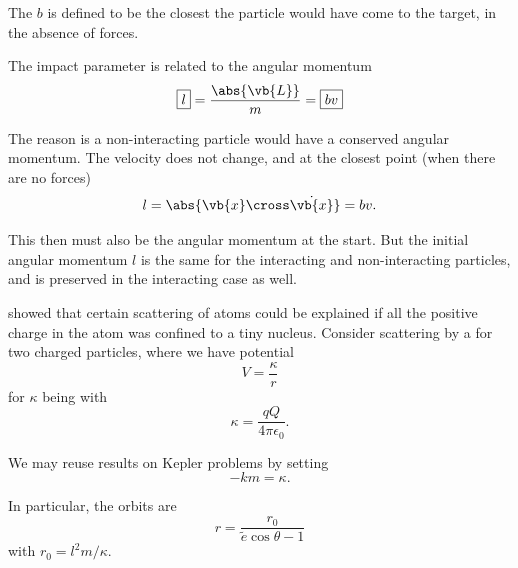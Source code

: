 \begin{definition}
    \label{def:impact-parameter}%
    The  \(b\) is defined to be the closest the particle would have come to the target, in the absence of forces.
\end{definition}

The impact parameter is related to the angular momentum
\begin{equation}
    \boxed{l} = \frac{\abs{\vb{L}}}{m} = \boxed{bv}
\end{equation}

The reason is a non-interacting particle would have a conserved angular momentum. The velocity does not change, and at the closest point (when there are no forces)
\begin{equation}
    l = \abs{\vb{x} \cross \dot{\vb{x}}} = bv.
\end{equation}

This then must also be the angular momentum at the start. But the initial angular momentum \(l\) is the same for the interacting and non-interacting particles, and is preserved in the interacting case as well.

\begin{example}
    \label{ex:charged-particles-repulsive-scattering}%
     showed that certain scattering of atoms could be explained if all the positive charge in the atom was confined to a tiny nucleus. Consider scattering by a  for two charged particles, where we have potential
    \begin{equation}
        V = \frac{\kappa}{r}
    \end{equation}
    for \(\kappa\) being  with
    \begin{equation}
        \kappa = \frac{q Q}{4 \pi \epsilon_0}.
    \end{equation}

    We may reuse results on Kepler problems by setting
    \begin{equation}
        - km = \kappa.
    \end{equation}

    In particular, the orbits are 
    \begin{equation}
        r = \frac{r_0}{\tilde{e} \cos \theta - 1}
    \end{equation}
    with \(r_0 = l^2 m / \kappa\).
\end{example}

